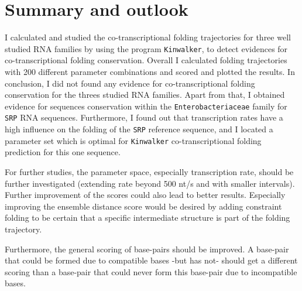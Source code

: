 \documentclass[ twoside,openright,titlepage,numbers=noenddot,headinclude,%
                footinclude=false, cleardoublepage=empty,abstractoff, %
                BCOR=5mm,paper=a4,fontsize=11pt,%
                ngerman,american,%
                ]{scrreprt}
\begin{document}

\section{Summary and outlook}




I calculated and studied the co-transcriptional folding trajectories for three well studied RNA families by using the program \texttt{Kinwalker}, to detect evidences for co-transcriptional folding conservation. Overall I calculated folding trajectories with 200 different parameter combinations and scored and plotted the results. 
In conclusion, I did not found any evidence for co-transcriptional folding conservation for the threes studied RNA families. Apart from that, I obtained evidence for sequences conservation within the \texttt{Enterobacteriaceae} family for \texttt{SRP} RNA sequences.
Furthermore, I found out that transcription rates have a high influence on the folding of the \texttt{SRP} reference sequence, and I located a parameter set which is optimal for \texttt{Kinwalker} co-transcriptional folding prediction for this one sequence.


For further studies, the parameter space, especially transcription rate, should be further investigated (extending rate beyond 500 nt/s and with smaller intervals). 
Further improvement of the scores could also lead to better results. Especially improving the ensemble distance score would be desired by adding constraint folding to be certain that a specific intermediate structure is part of the folding trajectory.

Furthermore, the general scoring of base-pairs should be improved. A base-pair that could be formed due to compatible bases -but has not- should get a different scoring than a base-pair that could never form this base-pair due to incompatible bases.
  
\end{document}
